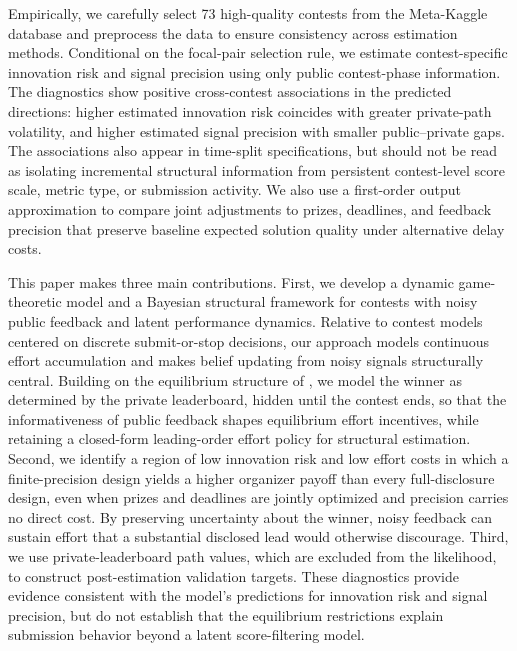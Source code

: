 \documentclass[mnsc]{informs3}
\begin{document}
Empirically, we carefully select 73 high-quality contests from the Meta-Kaggle database and preprocess the data to ensure consistency across estimation methods.
Conditional on the focal-pair selection rule, we estimate contest-specific innovation risk and signal precision using only public contest-phase information.
The diagnostics show positive cross-contest associations in the predicted directions: higher estimated innovation risk coincides with greater private-path volatility, and higher estimated signal precision with smaller public--private gaps. The associations also appear in time-split specifications, but should not be read as isolating incremental structural information from persistent contest-level score scale, metric type, or submission activity.
We also use a first-order output approximation to compare joint adjustments to prizes, deadlines, and feedback precision that preserve baseline expected solution quality under alternative delay costs.


This paper makes three main contributions.
First, we develop a dynamic game-theoretic model and a Bayesian structural framework for contests with noisy public feedback and latent performance dynamics.
Relative to contest models centered on discrete submit-or-stop decisions, our approach models continuous effort accumulation and makes belief updating from noisy signals structurally central.
Building on the equilibrium structure of \citet{Ryvkin2022Fight}, we model the winner as determined by the private leaderboard, hidden until the contest ends, so that the informativeness of public feedback shapes equilibrium effort incentives, while retaining a closed-form leading-order effort policy for structural estimation.
Second, we identify a region of low innovation risk and low effort costs in which a finite-precision design yields a higher organizer payoff than every full-disclosure design, even when prizes and deadlines are jointly optimized and precision carries no direct cost. By preserving uncertainty about the winner, noisy feedback can sustain effort that a substantial disclosed lead would otherwise discourage.
Third, we use private-leaderboard path values, which are excluded from the likelihood, to construct post-estimation validation targets.
These diagnostics provide evidence consistent with the model's predictions for innovation risk and signal precision, but do not establish that the equilibrium restrictions explain submission behavior beyond a latent score-filtering model.
\end{document}
